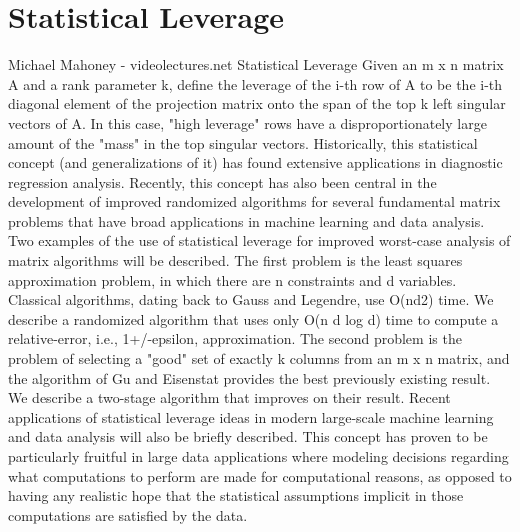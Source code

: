 \section{Statistical Leverage}
Michael Mahoney - videolectures.net Statistical Leverage Given an m x n matrix A and a rank parameter k, define the leverage of the i-th row of A to be the i-th diagonal element of the projection matrix onto the span of the top k left singular vectors of A. In this case, "high leverage" rows have a disproportionately large amount of the "mass" in the top singular vectors. Historically, this statistical concept (and generalizations of it) has found extensive applications in diagnostic regression analysis. Recently, this concept has also been central in the development of improved randomized algorithms for several fundamental matrix problems that have broad applications in machine learning and data analysis. Two examples of the use of statistical leverage for improved worst-case analysis of matrix algorithms will be described. The first problem is the least squares approximation problem, in which there are n constraints and d variables. Classical algorithms, dating back to Gauss and Legendre, use O(nd2) time. We describe a randomized algorithm that uses only O(n d log d) time to compute a relative-error, i.e., 1+/-epsilon, approximation. The second problem is the problem of selecting a "good" set of exactly k columns from an m x n matrix, and the algorithm of Gu and Eisenstat provides the best previously existing result. We describe a two-stage algorithm that improves on their result. Recent applications of statistical leverage ideas in modern large-scale machine learning and data analysis will also be briefly described. This concept has proven to be particularly fruitful in large data applications where modeling decisions regarding what computations to perform are made for computational reasons, as opposed to having any realistic hope that the statistical assumptions implicit in those computations are satisfied by the data. 
